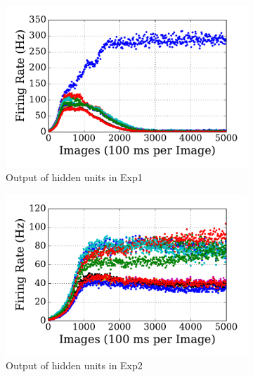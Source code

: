 \begin{figure}
\DIFdelendFL \DIFaddbeginFL \begin{subfigure}[t]{0.48\textwidth}
		\DIFaddendFL \includegraphics[width=\textwidth]{pics_sdlm/10_exp_SRBM_Orig/exp1_hid_s.pdf}
		\caption{Output of hidden units in Exp1}
	\end{subfigure}
	\DIFdelbeginFL %
\DIFdelendFL \DIFaddbeginFL \begin{subfigure}[t]{0.48\textwidth}
		\DIFaddendFL \includegraphics[width=\textwidth]{pics_sdlm/10_exp_SRBM_Orig/exp2_hid_s.pdf}
		\caption{Output of hidden units in Exp2}
	\end{subfigure}\\
	\DIFdelbeginFL %
\DIFdelendFL \DIFaddbeginFL \begin{subfigure}[t]{0.48\textwidth}

\end{subfigure}
\end{figure}
